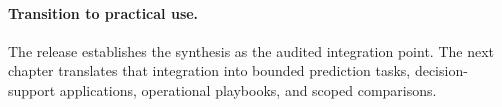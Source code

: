 \begingroup
\small

\endgroup

\paragraph{Transition to practical use.}
The release establishes the synthesis as the audited integration point.
The next chapter translates that integration into bounded prediction tasks,
decision-support applications, operational playbooks, and scoped comparisons.
